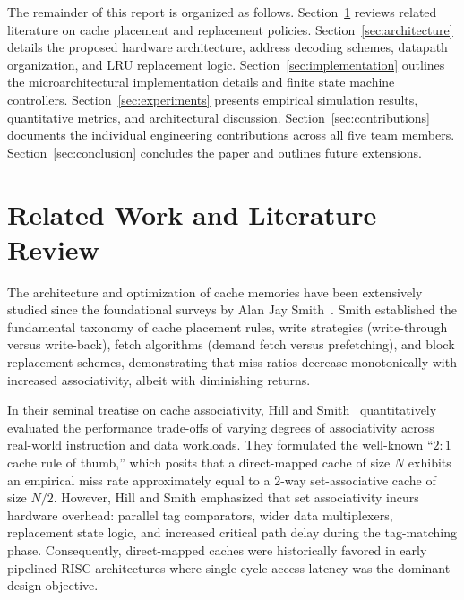 \documentclass[conference]{IEEEtran}
\begin{document}
The remainder of this report is organized as follows. Section~\ref{sec:related_work} reviews related literature on cache placement and replacement policies. Section~\ref{sec:architecture} details the proposed hardware architecture, address decoding schemes, datapath organization, and LRU replacement logic. Section~\ref{sec:implementation} outlines the microarchitectural implementation details and finite state machine controllers. Section~\ref{sec:experiments} presents empirical simulation results, quantitative metrics, and architectural discussion. Section~\ref{sec:contributions} documents the individual engineering contributions across all five team members. Section~\ref{sec:conclusion} concludes the paper and outlines future extensions.

\section{Related Work and Literature Review}
\label{sec:related_work}

The architecture and optimization of cache memories have been extensively studied since the foundational surveys by Alan Jay Smith~\cite{smith1982cache}. Smith established the fundamental taxonomy of cache placement rules, write strategies (write-through versus write-back), fetch algorithms (demand fetch versus prefetching), and block replacement schemes, demonstrating that miss ratios decrease monotonically with increased associativity, albeit with diminishing returns.

In their seminal treatise on cache associativity, Hill and Smith~\cite{hill1989evaluating} quantitatively evaluated the performance trade-offs of varying degrees of associativity across real-world instruction and data workloads. They formulated the well-known ``$2:1$ cache rule of thumb,'' which posits that a direct-mapped cache of size $N$ exhibits an empirical miss rate approximately equal to a 2-way set-associative cache of size $N/2$. However, Hill and Smith emphasized that set associativity incurs hardware overhead: parallel tag comparators, wider data multiplexers, replacement state logic, and increased critical path delay during the tag-matching phase. Consequently, direct-mapped caches were historically favored in early pipelined RISC architectures where single-cycle access latency was the dominant design objective.
\end{document}
